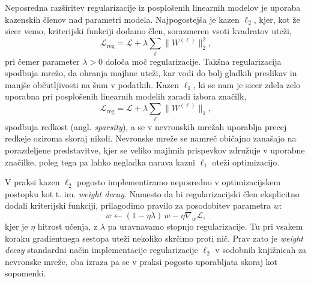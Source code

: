 Neposredna razširitev regularizacije iz posplošenih linearnih modelov je uporaba kazenskih členov nad parametri modela. Najpogostejša je kazen $\ell_2$, kjer, kot že sicer vemo, kriterijski funkciji dodamo člen, sorazmeren vsoti kvadratov uteži,
\[
\mathcal{L}_{\text{reg}} = \mathcal{L} + \lambda \sum_{\ell} \|W^{(\ell)}\|_2^2,
\]
pri čemer parameter $\lambda > 0$ določa moč regularizacije. Takšna regularizacija spodbuja mrežo, da ohranja majhne uteži, kar vodi do bolj gladkih preslikav in manjše občutljivosti na šum v podatkih. Kazen $\ell_1$, ki se nam je sicer zdela zelo uporabna pri posplošenih linearnih modelih zaradi izbora značilk,
\[
\mathcal{L}_{\text{reg}} = \mathcal{L} + \lambda \sum_{\ell} \|W^{(\ell)}\|_1,
\]
spodbuja redkost (angl. {\em sparsity}), a se v nevronskih mrežah uporablja precej redkeje oziroma skoraj nikoli. Nevronske mreže se namreč običajno zanašajo na porazdeljene predstavitve, kjer se veliko majhnih prispevkov združuje v uporabne značilke, poleg tega pa lahko negladka narava kazni $\ell_1$ oteži optimizacijo.

V praksi kazen $\ell_2$ pogosto implementiramo neposredno v optimizacijskem postopku kot t. im. \emph{weight decay}. Namesto da bi regularizacijski člen eksplicitno dodali kriterijski funkciji, prilagodimo pravilo za posodobitev parametra $w$:
\[
w \leftarrow (1 - \eta \lambda)\, w - \eta \nabla_w \mathcal{L},
\]
kjer je $\eta$ hitrost učenja, z $\lambda$ pa uravnavamo stopnjo regularizacije. Tu pri vsakem koraku gradientnega sestopa uteži nekoliko skrčimo proti nič. Prav zato je {\em weight decay} standardni način implementacije regularizacije $\ell_2$ v sodobnih knjižnicah za nevronske mreže, oba izraza pa se v praksi pogosto uporabljata skoraj kot sopomenki.

